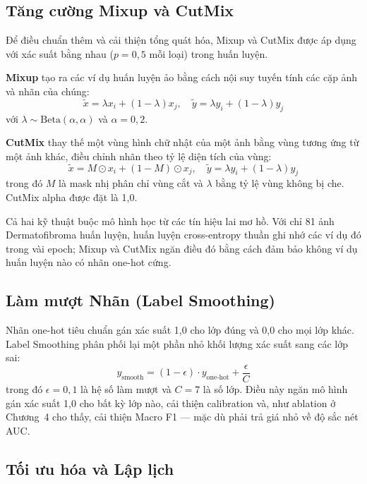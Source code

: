 \subsection{Tăng cường Mixup và CutMix}

Để điều chuẩn thêm và cải thiện tổng quát hóa, Mixup và CutMix được áp dụng với xác suất bằng nhau ($p = 0{,}5$ mỗi loại) trong huấn luyện.

\textbf{Mixup} tạo ra các ví dụ huấn luyện ảo bằng cách nội suy tuyến tính các cặp ảnh và nhãn của chúng:
\begin{equation}
\tilde{x} = \lambda x_i + (1 - \lambda) x_j, \quad \tilde{y} = \lambda y_i + (1 - \lambda) y_j
\end{equation}
với $\lambda \sim \text{Beta}(\alpha, \alpha)$ và $\alpha = 0{,}2$.

\textbf{CutMix} thay thế một vùng hình chữ nhật của một ảnh bằng vùng tương ứng từ một ảnh khác, điều chỉnh nhãn theo tỷ lệ diện tích của vùng:
\begin{equation}
\tilde{x} = M \odot x_i + (1 - M) \odot x_j, \quad \tilde{y} = \lambda y_i + (1 - \lambda) y_j
\end{equation}
trong đó $M$ là mask nhị phân chỉ vùng cắt và $\lambda$ bằng tỷ lệ vùng không bị che. CutMix alpha được đặt là 1,0.

Cả hai kỹ thuật buộc mô hình học từ các tín hiệu lai mơ hồ. Với chỉ 81 ảnh Dermatofibroma huấn luyện, huấn luyện cross-entropy thuần ghi nhớ các ví dụ đó trong vài epoch; Mixup và CutMix ngăn điều đó bằng cách đảm bảo không ví dụ huấn luyện nào có nhãn one-hot cứng.

\subsection{Làm mượt Nhãn (Label Smoothing)}

Nhãn one-hot tiêu chuẩn gán xác suất 1,0 cho lớp đúng và 0,0 cho mọi lớp khác. Label Smoothing phân phối lại một phần nhỏ khối lượng xác suất sang các lớp sai:
\begin{equation}
y_{\text{smooth}} = (1 - \epsilon) \cdot y_{\text{one-hot}} + \frac{\epsilon}{C}
\end{equation}
trong đó $\epsilon = 0{,}1$ là hệ số làm mượt và $C = 7$ là số lớp. Điều này ngăn mô hình gán xác suất 1,0 cho bất kỳ lớp nào, cải thiện calibration và, như ablation ở Chương~4 cho thấy, cải thiện Macro F1 --- mặc dù phải trả giá nhỏ về độ sắc nét AUC.

\subsection{Tối ưu hóa và Lập lịch}

